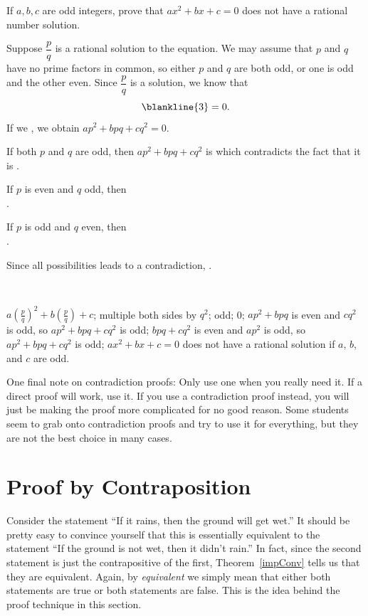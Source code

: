 \begin{fib}\label{fibRatPoly}
If $a, b, c$ are odd integers, prove that $ax^2 + bx + c = 0$ does
not have a rational number solution.
\begin{pf}
Suppose $\dfrac{p}{q}$ is a rational solution
to the equation. We may assume that $p$ and $q$ have no prime
factors in common, so either $p$ and $q$ are both odd, or one is
odd and the other even. 
Since $\dfrac{p}{q}$ is a solution, we know that 
$$\blankline{3} = 0.$$
If we , we obtain  $ap^2 + bpq + cq^2 = 0.$

If both $p$ and $q$ are odd, then $ap^2 + bpq + cq^2 $ is 
 which contradicts the fact that it is .

If $p$ is even and  $q$ odd, then  \blanklinefill\\ \blanklinefill.

If $p$ is odd and  $q$ even, then  \blanklinefill\\ \blanklinefill.

Since all possibilities leads to a contradiction, \blanklinefill.

\blanklinefill\\
\end{pf}
\begin{answer}
$a\left(\frac{p}{q}\right)^2 + b\left(\frac{p}{q}\right) + c$;
multiple both sides by $q^2$; 
odd;
0;
$ap^2 + bpq$ is even and $cq^2$ is odd, so  $ap^2 + bpq + cq^2$ is odd;
$bpq + cq^2$ is even and $ap^2$ is odd, so  $ap^2 + bpq + cq^2$ is odd;
$ax^2 + bx + c = 0$ does not have a rational solution if $a$, $b$, and $c$ are odd.
\end{answer}
\end{fib}

One final note on contradiction proofs: 
Only use one when you really need it.
If a direct proof will work, use it. If you use a contradiction proof
instead, you will just be making the proof more complicated
for no good reason. Some students seem to grab onto 
contradiction proofs and try to use it for everything, but they are
not the best choice in many cases. 

\newpage
\section{Proof by Contraposition}\label{section:contraposition}

Consider the statement ``If it rains, then the ground will get wet.''  
It should be pretty easy to convince yourself that this is essentially equivalent to the statement 
``If the ground is not wet, then it didn't rain.''
In fact, since the second statement is just the contrapositive of the first, 
Theorem~\ref{impConv} tells us that they are equivalent.
Again, by {\em equivalent} we simply mean that
either both statements are true or both statements are false.  
This is the idea behind the proof technique in this section.

